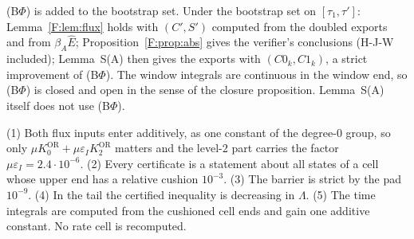 \documentclass[11pt]{article}
\newcommand{\OR}{\mathrm{OR}}\newcommand{\eI}{\varepsilon_I}
\begin{document}
\begin{remark}\label{F:rem:boot}
(B$\Phi$) is added to the bootstrap set. Under the bootstrap set on $[\tau_1,\tau']$: Lemma~\ref{F:lem:flux} holds with $(C',S')$ computed from the doubled exports and from $\beta_A\hat E$; Proposition~\ref{F:prop:abs} gives the verifier's conclusions (H-J-W included); Lemma~S(A) then gives the exports with $(C0_k,C1_k)$, a strict improvement of (B$\Phi$). The window integrals are continuous in the window end, so (B$\Phi$) is closed and open in the sense of the closure proposition. Lemma~S(A) itself does not use (B$\Phi$).
\end{remark}

\begin{remark}
(1) Both flux inputs enter additively, as one constant of the degree-0 group, so only $\mu K_0^{\OR}+\mu\eI K_2^{\OR}$ matters and the level-2 part carries the factor $\mu\eI=2.4\cdot10^{-6}$. (2) Every certificate is a statement about all states of a cell whose upper end has a relative cushion $10^{-3}$. (3) The barrier is strict by the pad $10^{-9}$. (4) In the tail the certified inequality is decreasing in $\Lambda$. (5) The time integrals are computed from the cushioned cell ends and gain one additive constant. No rate cell is recomputed.
\end{remark}
\end{document}
